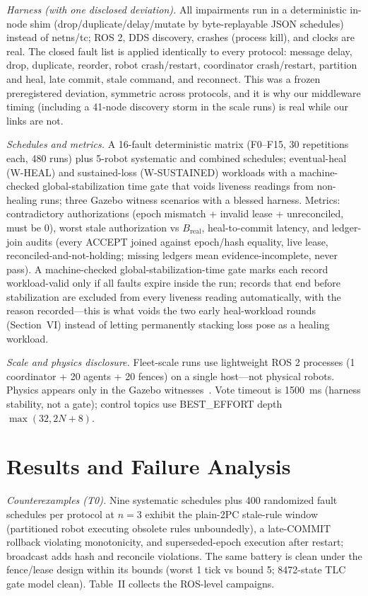 \documentclass[10pt,journal]{IEEEtran}
\begin{document}
\emph{Harness (with one disclosed deviation).} All impairments run in
a deterministic in-node shim (drop/duplicate/delay/mutate by
byte-replayable JSON schedules) instead of netns/tc; ROS 2, DDS
discovery, crashes (process kill), and clocks are real. The closed
fault list is applied identically to every protocol: message delay,
drop, duplicate, reorder, robot crash/restart, coordinator
crash/restart, partition and heal, late commit, stale command, and
reconnect. This was a frozen preregistered deviation, symmetric
across protocols, and it is why our middleware timing (including a
41-node discovery storm in the scale runs) is real while our links
are not.

\emph{Schedules and metrics.} A 16-fault deterministic matrix
(F0--F15, 30 repetitions each, 480 runs) plus 5-robot systematic and
combined schedules; eventual-heal (W-HEAL) and sustained-loss
(W-SUSTAINED) workloads with a machine-checked global-stabilization
time gate that voids liveness readings from non-healing runs; three
Gazebo witness scenarios with a blessed harness. Metrics:
contradictory authorizations (epoch mismatch + invalid lease +
unreconciled, must be 0), worst stale authorization vs $B_{\text{real}}$,
heal-to-commit latency, and ledger-join audits (every ACCEPT joined
against epoch/hash equality, live lease, reconciled-and-not-holding;
missing ledgers mean evidence-incomplete, never pass). A
machine-checked global-stabilization-time gate marks each record
workload-valid only if all faults expire inside the run; records that
end before stabilization are excluded from every liveness reading
automatically, with the reason recorded---this is what voids the two
early heal-workload rounds (Section~VI) instead of letting permanently
stacking loss pose as a healing workload.

\emph{Scale and physics disclosure.} Fleet-scale runs use lightweight
ROS 2 processes (1 coordinator + 20 agents + 20 fences) on a single
host---not physical robots. Physics appears only in the Gazebo
witnesses~\cite{koenig2004gazebo}. Vote timeout is 1500~ms (harness
stability, not a gate); control topics use BEST\_EFFORT depth
$\max(32,2N{+}8)$.

\section{Results and Failure Analysis}
\label{sec:results}

\emph{Counterexamples (T0).} Nine systematic schedules plus 400
randomized fault schedules per protocol at $n{=}3$ exhibit the
plain-2PC stale-rule window (partitioned robot executing obsolete
rules unboundedly), a late-COMMIT rollback violating monotonicity,
and superseded-epoch execution after restart; broadcast adds hash and
reconcile violations. The same battery is clean under the fence/lease
design within its bounds (worst 1 tick vs bound 5; 8472-state TLC
gate model clean). Table~II collects the ROS-level campaigns.
\end{document}
